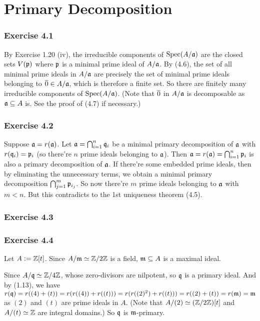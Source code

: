 \documentclass[../A&R.tex]{subfiles}
\begin{document}
\chapter{Primary Decomposition}

\subsection*{Exercise 4.1}

By Exercise 1.20 (iv), the irreducible components of $\operatorname{Spec}(A/\mathfrak{a})$ are the closed sets $V(\mathfrak{p})$ where $\mathfrak{p}$ is a minimal prime ideal of $A/\mathfrak{a}$. By (4.6), the set of all minimal prime ideals in $A/\mathfrak{a}$ are precisely the set of minimal prime ideals belonging to $\overline{0} \in A/\mathfrak{a}$, which is therefore a finite set. So there are finitely many irreducible components of $\operatorname{Spec}(A/\mathfrak{a})$. (Note that $\overline{0}$ in $A/\mathfrak{a}$ is decomposable as $\mathfrak{a} \subseteq A$ is. See the proof of (4.7) if necessary.)

\subsection*{Exercise 4.2}

Suppose $\mathfrak{a} = r(\mathfrak{a})$. Let $\mathfrak{a} = \bigcap_{i=1}^n \mathfrak{q}_i$ be a minimal primary decomposition of $\mathfrak{a}$ with $r(\mathfrak{q}_i)=\mathfrak{p}_i$ (so there're $n$ prime ideals belonging to $\mathfrak{a}$). Then $\mathfrak{a} = r(\mathfrak{a}) = \bigcap_{i=1}^n \mathfrak{p}_i$ is also a primary decomposition of $\mathfrak{a}$. If there're some embedded prime ideals, then by eliminating the unnecessary terms, we obtain a minimal primary decomposition $\bigcap_{j=1}^m \mathfrak{p}_{i_j}$. So now there're $m$ prime ideals belonging to $\mathfrak{a}$ with $m<n$. But this contradicts to the 1st uniqueness theorem (4.5).

\subsection*{Exercise 4.3}

\subsection*{Exercise 4.4}

Let $A:=\mathbb{Z}[t]$. Since $A/\mathfrak{m} \simeq \mathbb{Z}/2\mathbb{Z}$ is a field, $\mathfrak{m} \subseteq A$ is a maximal ideal.

Since $A/\mathfrak{q} \simeq \mathbb{Z}/4\mathbb{Z}$, whose zero-divisors are nilpotent, so $\mathfrak{q}$ is a primary ideal. And by (1.13), we have $r(\mathfrak{q}) = r((4)+(t)) = r( r((4)) + r((t)) ) = r( r((2)^2) + r((t)) ) = r( (2) + (t) ) = r(\mathfrak{m}) = \mathfrak{m}$ as $(2)$ and $(t)$ are prime ideals in $A$. (Note that $A/(2) \simeq (\mathbb{Z}/2\mathbb{Z})[t]$ and $A/(t) \simeq \mathbb{Z}$ are integral domains.) So $\mathfrak{q}$ is $\mathfrak{m}$-primary.
\end{document}

